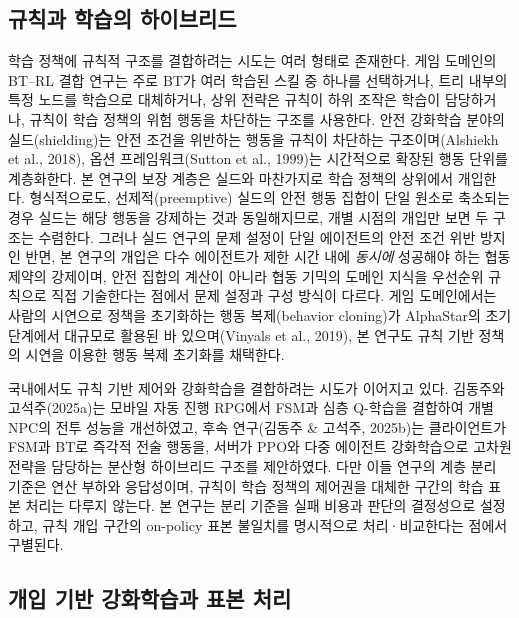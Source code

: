\documentclass[12pt]{article}      %
\begin{document}
\subsection{규칙과 학습의 하이브리드}

학습 정책에 규칙적 구조를 결합하려는 시도는 여러 형태로 존재한다. 게임 도메인의
BT--RL 결합 연구는 주로 BT가 여러 학습된 스킬 중 하나를 선택하거나, 트리 내부의
특정 노드를 학습으로 대체하거나, 상위 전략은 규칙이 하위 조작은 학습이 담당하거나,
규칙이 학습 정책의 위험 행동을 차단하는 구조를 사용한다. 안전 강화학습 분야의
실드(shielding)는 안전 조건을 위반하는 행동을 규칙이 차단하는
구조이며(Alshiekh et al., 2018), 옵션 프레임워크(Sutton et al.,
1999)는 시간적으로 확장된 행동 단위를 계층화한다. 본 연구의 보장 계층은 실드와
마찬가지로 학습 정책의 상위에서 개입한다. 형식적으로도, 선제적(preemptive)
실드의 안전 행동 집합이 단일 원소로 축소되는 경우 실드는 해당 행동을 강제하는
것과 동일해지므로, 개별 시점의 개입만 보면 두 구조는 수렴한다. 그러나 실드
연구의 문제 설정이 단일 에이전트의 안전 조건 위반 방지인 반면, 본 연구의 개입은
다수 에이전트가 제한 시간 내에 \emph{동시에} 성공해야 하는 협동 제약의
강제이며, 안전 집합의 계산이 아니라 협동 기믹의 도메인 지식을 우선순위 규칙으로
직접 기술한다는 점에서 문제 설정과 구성 방식이 다르다. 게임 도메인에서는 사람의
시연으로 정책을 초기화하는 행동 복제(behavior cloning)가 AlphaStar의 초기
단계에서 대규모로 활용된 바 있으며(Vinyals et al., 2019), 본 연구도 규칙 기반
정책의 시연을 이용한 행동 복제 초기화를 채택한다.

국내에서도 규칙 기반 제어와 강화학습을 결합하려는 시도가 이어지고 있다. 김동주와
고석주(2025a)는 모바일 자동 진행 RPG에서 FSM과 심층 Q-학습을 결합하여 개별 NPC의
전투 성능을 개선하였고, 후속 연구(김동주 \& 고석주, 2025b)는 클라이언트가 FSM과
BT로 즉각적 전술 행동을, 서버가 PPO와 다중 에이전트 강화학습으로 고차원 전략을
담당하는 분산형 하이브리드 구조를 제안하였다. 다만 이들 연구의 계층 분리 기준은
연산 부하와 응답성이며, 규칙이 학습 정책의 제어권을 대체한 구간의 학습 표본
처리는 다루지 않는다. 본 연구는 분리 기준을 실패 비용과 판단의 결정성으로
설정하고, 규칙 개입 구간의 on-policy 표본 불일치를 명시적으로 처리·비교한다는
점에서 구별된다.

\subsection{개입 기반 강화학습과 표본 처리}
\end{document}

